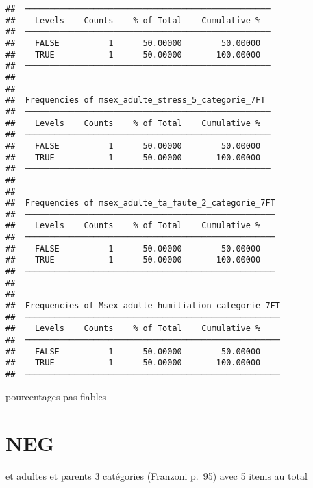 \documentclass[
]{article}
\begin{document}
\begin{verbatim}
##  ────────────────────────────────────────────────── 
##    Levels    Counts    % of Total    Cumulative %   
##  ────────────────────────────────────────────────── 
##    FALSE          1      50.00000        50.00000   
##    TRUE           1      50.00000       100.00000   
##  ────────────────────────────────────────────────── 
## 
## 
##  Frequencies of msex_adulte_stress_5_categorie_7FT  
##  ────────────────────────────────────────────────── 
##    Levels    Counts    % of Total    Cumulative %   
##  ────────────────────────────────────────────────── 
##    FALSE          1      50.00000        50.00000   
##    TRUE           1      50.00000       100.00000   
##  ────────────────────────────────────────────────── 
## 
## 
##  Frequencies of msex_adulte_ta_faute_2_categorie_7FT 
##  ─────────────────────────────────────────────────── 
##    Levels    Counts    % of Total    Cumulative %   
##  ─────────────────────────────────────────────────── 
##    FALSE          1      50.00000        50.00000   
##    TRUE           1      50.00000       100.00000   
##  ─────────────────────────────────────────────────── 
## 
## 
##  Frequencies of Msex_adulte_humiliation_categorie_7FT 
##  ──────────────────────────────────────────────────── 
##    Levels    Counts    % of Total    Cumulative %   
##  ──────────────────────────────────────────────────── 
##    FALSE          1      50.00000        50.00000   
##    TRUE           1      50.00000       100.00000   
##  ────────────────────────────────────────────────────
\end{verbatim}

pourcentages pas fiables

\hypertarget{neg}{%
\section{NEG}\label{neg}}

et adultes et parents 3 catégories (Franzoni p.~95) avec 5 items au
total
\end{document}
